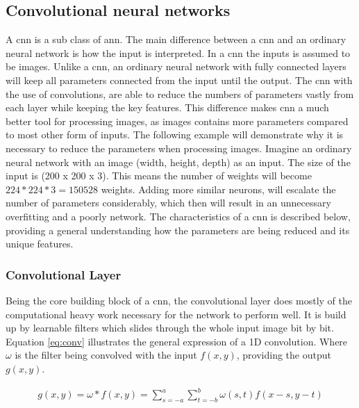 \documentclass[USenglish]{ifimaster}  %
\begin{document}
\subsection{Convolutional neural networks}
A \ac{cnn} is a sub class of \ac{ann}. The main difference between a \ac{cnn} and an ordinary neural network is how the input is interpreted. In a \ac{cnn} the inputs is assumed to be images. 
\newline
\newline
Unlike a \ac{cnn}, an ordinary neural network with fully connected layers will keep all parameters connected from the input until the output. The \ac{cnn} with the use of convolutions, are able to reduce the numbers of parameters vastly from each layer while keeping the key features. This difference makes \ac{cnn} a much better tool for processing images, as images contains more parameters compared to most other form of inputs. 
\newline
\newline
The following example will demonstrate why it is necessary to reduce the parameters when processing images. Imagine an ordinary neural network with an image (width, height, depth) as an input. The size of the input is (200 x 200 x 3). This means the number of weights will become $224 * 224 * 3 = 150528$ weights. Adding more similar neurons, will escalate the number of parameters considerably, which then will result in an unnecessary overfitting and a poorly network.
\newline
\newline
The characteristics of a \ac{cnn} is described below, providing a general understanding how the parameters are being reduced and its unique features.
\subsubsection{Convolutional Layer}
Being the core building block of a \ac{cnn}, the convolutional layer does mostly of the computational heavy work necessary for the network to perform well. 
It is build up by learnable filters which slides through the whole input image bit by bit. Equation \cref{eq:conv} illustrates the general expression of a 1D convolution. Where $\omega$ is the filter being convolved with the input $f(x,y)$, providing the output $g(x,y)$. 

\begin{equation}\label{eq:conv}
\begin{aligned}
g(x,y) = \omega * f(x,y) = \sum_{s=-a}^{a}\sum_{t=-b}^{b}\omega(s,t)f(x-s,y-t)
\end{aligned}
\end{equation}
\end{document}
